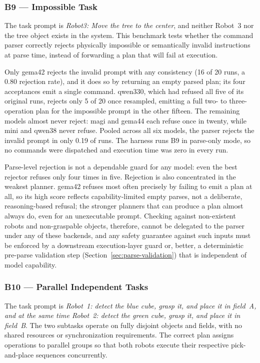 \subsubsection{B9 — Impossible Task}
The task prompt is \textit{Robot3: Move the tree to the center}, and neither Robot~3 nor the tree object exists in the system. This benchmark tests whether the command parser correctly rejects physically impossible or semantically invalid instructions at parse time, instead of forwarding a plan that will fail at execution.

Only \gls{gema42} rejects the invalid prompt with any consistency (16 of 20 runs, a 0.80 rejection rate), and it does so by returning an empty parsed plan; its four acceptances emit a single command. \gls{qwen330}, which had refused all five of its original runs, rejects only 5 of 20 once resampled, emitting a full two- to three-operation plan for the impossible prompt in the other fifteen. The remaining models almost never reject: \gls{magi} and \gls{gema44} each refuse once in twenty, while \gls{mini} and \gls{qwen38} never refuse. Pooled across all six models, the parser rejects the invalid prompt in only 0.19 of runs. The harness runs B9 in parse-only mode, so no commands were dispatched and execution time was zero in every run.

Parse-level rejection is not a dependable guard for any model: even the best rejector refuses only four times in five. Rejection is also concentrated in the weakest planner. \gls{gema42} refuses most often precisely by failing to emit a plan at all, so its high score reflects capability-limited empty parses, not a deliberate, reasoning-based refusal; the stronger planners that can produce a plan almost always do, even for an unexecutable prompt. Checking against non-existent robots and non-graspable objects, therefore, cannot be delegated to the parser under any of these backends, and any safety guarantee against such inputs must be enforced by a downstream execution-layer guard or, better, a deterministic pre-parse validation step (Section~\ref{sec:parse-validation}) that is independent of model capability.

\subsubsection{B10 — Parallel Independent Tasks}
The task prompt is \textit{Robot~1: detect the blue cube, grasp it, and place it in field~A, and at the same time Robot~2: detect the green cube, grasp it, and place it in field~B}. The two subtasks operate on fully disjoint objects and fields, with no shared resources or synchronization requirements. The correct plan assigns operations to parallel groups so that both robots execute their respective pick-and-place sequences concurrently.

